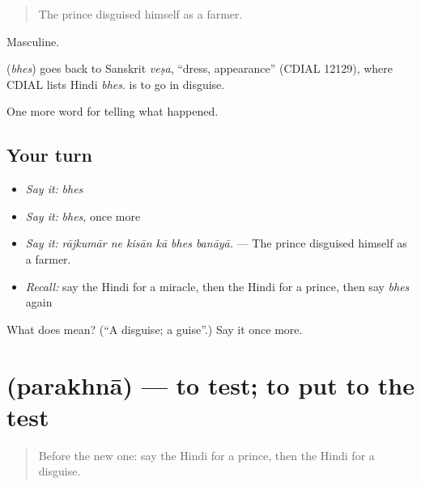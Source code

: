 \begin{quote}
The prince disguised himself as a farmer.
\end{quote}

Masculine.

\begin{cousinweb}
\textbf{} (\emph{bhes}) goes back to Sanskrit \emph{veṣa}, \textquotedblleft{}dress, appearance\textquotedblright{} (CDIAL 12129), where CDIAL lists Hindi \emph{bhes}. \textbf{ } is to go in disguise.
\end{cousinweb}

\begin{grammarlens}[title={What you've built}]
One more word for telling what happened.
\end{grammarlens}

\subsection*{Your turn}
\begin{itemize}
\raggedright
  \item \emph{Say it:} \emph{bhes}
  \item \emph{Say it:} \emph{bhes}, once more
  \item \emph{Say it:} \emph{rājkumār ne kisān kā bhes banāyā.} — The prince disguised himself as a farmer.
  \item \emph{Recall:} say the Hindi for a miracle, then the Hindi for a prince, then say \emph{bhes} again
\end{itemize}

\begin{tcolorbox}[breakable,colback=teal!4,colframe=teal!35!black,title={Before you move on}]
What does  mean? (\textquotedblleft{}A disguise; a guise\textquotedblright{}.) Say it once more.
\end{tcolorbox}
\section[\texorpdfstring{\hi{परखना} (parakhnā)}{परखना (parakhnā)}]{ (parakhnā) — to test; to put to the test}

\label{lesson:HI-C339-parakhna}



\begin{quote}
Before the new one: say the Hindi for a prince, then the Hindi for a disguise.
\end{quote}

